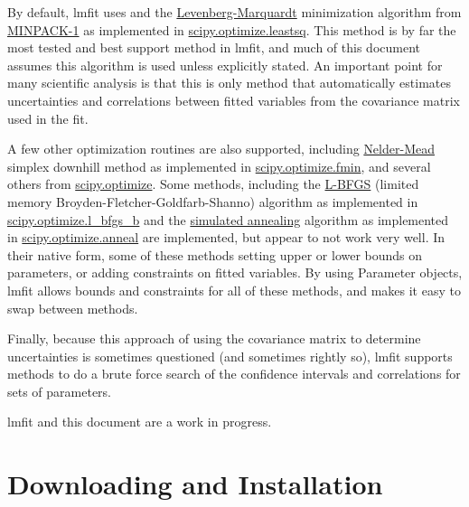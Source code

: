\documentclass[letterpaper,10pt,english]{sphinxmanual}
\begin{document}
By default, lmfit uses and the \href{http://en.wikipedia.org/wiki/Levenberg-Marquardt\_algorithm}{Levenberg-Marquardt} minimization
algorithm from \href{http://en.wikipedia.org/wiki/MINPACK}{MINPACK-1} as implemented in \href{http://docs.scipy.org/doc/scipy/reference/generated/scipy.optimize.leastsq.html}{scipy.optimize.leastsq}.
This method is by far the most tested and best support method in lmfit, and
much of this document assumes this algorithm is used unless explicitly
stated. An important point for many scientific analysis is that this is
only method that automatically estimates uncertainties and correlations
between fitted variables from the covariance matrix used in the fit.

A few other optimization routines are also supported, including
\href{http://en.wikipedia.org/wiki/Nelder-Mead\_method}{Nelder-Mead} simplex downhill method as implemented in
\href{http://docs.scipy.org/doc/scipy/reference/generated/scipy.optimize.fmin.html}{scipy.optimize.fmin}, and several others from \href{http://docs.scipy.org/doc/scipy/reference/optimize.html}{scipy.optimize}. Some
methods, including the \href{http://en.wikipedia.org/wiki/Limited-memory\_BFGS}{L-BFGS} (limited memory
Broyden-Fletcher-Goldfarb-Shanno) algorithm as implemented in
\href{http://docs.scipy.org/doc/scipy/reference/generated/scipy.optimize.fmin\_l\_bfgs\_b.html}{scipy.optimize.l\_bfgs\_b} and the \href{http://en.wikipedia.org/wiki/Simulated\_annealing}{simulated annealing} algorithm as
implemented in \href{http://docs.scipy.org/doc/scipy/reference/generated/scipy.optimize.anneal.html}{scipy.optimize.anneal} are implemented, but appear to not
work very well.  In their native form, some of these methods setting upper
or lower bounds on parameters, or adding constraints on fitted variables.
By using Parameter objects, lmfit allows bounds and constraints for all of
these methods, and makes it easy to swap between methods.

Finally, because this approach of using the covariance matrix to determine
uncertainties is sometimes questioned (and sometimes rightly so), lmfit
supports methods to do a brute force search of the confidence intervals and
correlations for sets of parameters.

lmfit and this document are a work in progress.


\chapter{Downloading and Installation}
\label{installation::doc}\label{installation:non-linear-least-square-minimization-for-python}\label{installation:downloading-and-installation}
\end{document}

